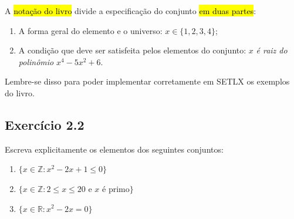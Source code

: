 \documentclass[
  letterpaper,
  DIV=11,
  numbers=noendperiod]{scrreprt}
\providecommand{\tightlist}{%
  \setlength{\itemsep}{0pt}\setlength{\parskip}{0pt}}\usepackage{longtable,booktabs,array}
\begin{document}
\begin{tcolorbox}
A {\hl{notação do livro}} divide a especificação do conjunto {\hl{em
duas partes}}:

\begin{enumerate}
\def\labelenumi{\arabic{enumi}.}
\tightlist
\item
  A forma geral do elemento e o universo: $x \in \{1, 2, 3, 4\}$;
\item
  A condição que deve ser satisfeita pelos elementos do conjunto: $x$
  \emph{é raiz do polinômio} $x^4 - 5x^2 + 6$.
\end{enumerate}

Lembre-se disso para poder implementar corretamente em SETLX os exemplos
do livro.

\end{tcolorbox}

\subsection*{Exercício 2.2}\label{exr-2-2}

Escreva explicitamente os elementos dos seguintes conjuntos:

\begin{enumerate}
\def\labelenumi{\alph{enumi})}
\item
  $\{ x \in \mathbb{Z}: x^2 - 2x + 1 \leq 0 \}$
\item
  $\{ x \in \mathbb{Z}: 2 \leq x \leq 20 \text{ e } x \text{ é primo} \}$
\item
  $\{ x \in \mathbb{R}: x^2 - 2x = 0 \}$
\end{enumerate}
\end{document}
